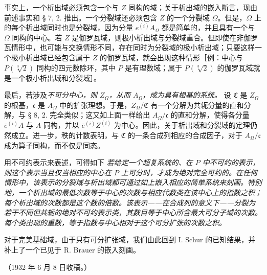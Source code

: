 事实上，一个析出域必须包含一个与 \(Z\) 同构的域；关于析出域的嵌入断言，现由前述事实和 § 7, 2. 推出。一个分裂域还必须包含 \(Z\) 的一个分裂域 \(\Omega\)。但是，\(\Omega\) 上的每个析出域同时也是分裂域，因为分量 \(e^{(i)}A_\Omega\) 都是简单的，并且具有一个与 \(\Omega\) 同构的中心。若 \(Z\) 是伽罗瓦域，则极小析出域与分裂域重合。但即使在非伽罗瓦情形中，也可能与交换情形不同，存在同时为分裂域的极小析出域；只要这样一个极小析出域已经包含属于 \(Z\) 的伽罗瓦域，就会出现这种情形［例：中心与 \(P(\sqrt[3]{2})\) 同构的四元数除环，其中 \(P\) 是有理数域；属于 \(P(\sqrt[3]{2})\) 的伽罗瓦域就是一个极小析出域和分裂域］。

最后，若涉及\emph{不可分中心，则 \(Z_\Omega\)，从而 \(A_\Omega\)，成为具有根基的系统。} 设 \(\mathfrak C\) 是 \(Z_\Omega\) 的根基，\(\mathfrak c\) 是 \(A_\Omega\) 中的扩张理想。于是，\(Z_\Omega/\mathfrak C\) 有一个分解为共轭分量的直和分解，与 § 8, 2. 完全类似；这又如上面一样给出 \(A_\Omega/\mathfrak c\) 的直和分解，使得各分量 \(\bar e^{(i)}A\) 与 \(A\) 同构，并以 \(\bar e^{(i)}Z^{(i)}\) 为中心。因此，关于析出域和分裂域的定理仍然成立。进一步，秩的计数表明，与 \(\mathfrak C\) 的一条合成列相应的合成因子，对于 \(A_\Omega/\mathfrak c\) 成为算子同构，而不仅是同态。

用不可约表示来表述，可得如下\textbf{} \emph{若给定一个超复系统的、在 \(P\) 中不可约的表示，则这个表示当且仅当相应的中心在 \(P\) 上可分时，才成为绝对完全可约的。在任何情形中，该表示的分裂域与析出域都可通过如上嵌入相应的简单系统来刻画。特别地，一个析出域的最低次数等于中心的次数与相应代数类在该中心上的指数之积；每个析出域的次数都是这个数的倍数。该表示——在合成列的意义下——分裂为若干不同但共轭的绝对不可约表示类，其数目等于中心所含最大可分子域的次数。每个类出现的重数，等于指数与中心相对于这个可分扩张的次数之积。}

对于完美基础域，由于只有可分扩张域，我们由此回到 I. Schur 的已知结果，并补上了一个已见于 R. Brauer 的嵌入刻画。

\begin{center}
（1932 年 6 月 8 日收稿。）
\end{center}

\clearpage

\setcounter{footnote}{0}
